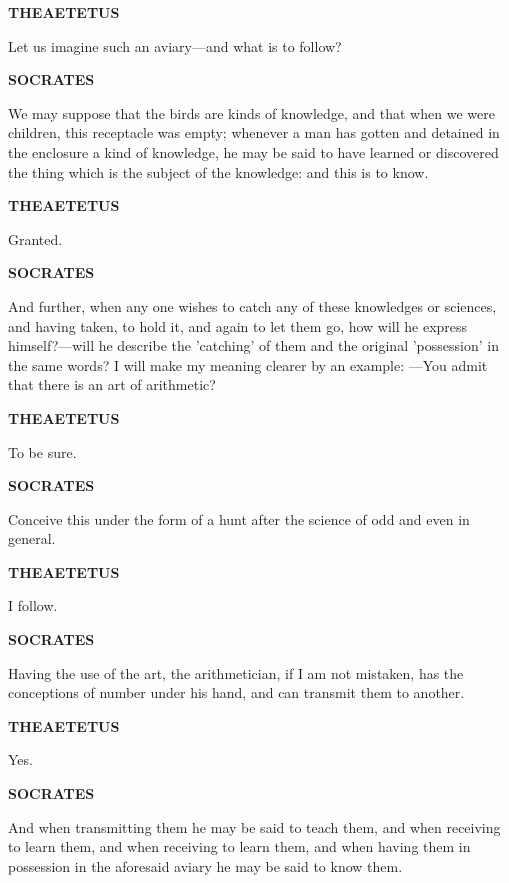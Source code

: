 \documentclass[11pt,letter]{article}
\begin{document}
\par \textbf{THEAETETUS}
\par   Let us imagine such an aviary—and what is to follow?

\par \textbf{SOCRATES}
\par   We may suppose that the birds are kinds of knowledge, and that when we were children, this receptacle was empty; whenever a man has gotten and detained in the enclosure a kind of knowledge, he may be said to have learned or discovered the thing which is the subject of the knowledge:  and this is to know.

\par \textbf{THEAETETUS}
\par   Granted.

\par \textbf{SOCRATES}
\par   And further, when any one wishes to catch any of these knowledges or sciences, and having taken, to hold it, and again to let them go, how will he express himself?—will he describe the 'catching' of them and the original 'possession' in the same words? I will make my meaning clearer by an example: —You admit that there is an art of arithmetic?

\par \textbf{THEAETETUS}
\par   To be sure.

\par \textbf{SOCRATES}
\par   Conceive this under the form of a hunt after the science of odd and even in general.

\par \textbf{THEAETETUS}
\par   I follow.

\par \textbf{SOCRATES}
\par   Having the use of the art, the arithmetician, if I am not mistaken, has the conceptions of number under his hand, and can transmit them to another.

\par \textbf{THEAETETUS}
\par   Yes.

\par \textbf{SOCRATES}
\par   And when transmitting them he may be said to teach them, and when receiving to learn them, and when receiving to learn them, and when having them in possession in the aforesaid aviary he may be said to know them.
\end{document}
